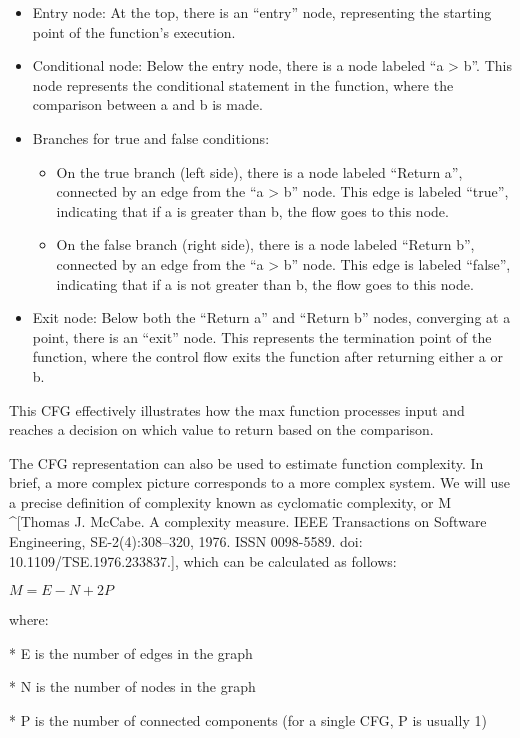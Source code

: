 \begin{markdown}

\begin{itemize}
\item
Entry node: At the top, there is an “entry” node, representing the starting point of the function’s execution.

\item
Conditional node: Below the entry node, there is a node labeled “a > b”. This node represents the conditional statement in the function, where the comparison between a and b is made.

\item
Branches for true and false conditions:
\begin{itemize}
\item
On the true branch (left side), there is a node labeled “Return a”, connected by an edge from the “a > b” node. This edge is labeled “true”, indicating that if a is greater than b, the flow goes to this node.

\item
On the false branch (right side), there is a node labeled “Return b”, connected by an edge from the “a > b” node. This edge is labeled “false”, indicating that if a is not greater than b, the flow goes to this node.
\end{itemize}

\item
Exit node: Below both the “Return a” and “Return b” nodes, converging at a point, there is an “exit” node. This represents the termination point of the function, where the control flow exits the function after returning either a or b.
\end{itemize}

This CFG effectively illustrates how the max function processes input and reaches a decision on which value to return based on the comparison.

The CFG representation can also be used to estimate function complexity. In brief, a more complex picture corresponds to a more complex system. We will use a precise definition of complexity known as cyclomatic complexity, or M ^[Thomas J. McCabe. A complexity measure. IEEE Transactions on Software Engineering, SE-2(4):308–320, 1976. ISSN 0098-5589. doi: 10.1109/TSE.1976.233837.], which can be calculated as follows:
\end{markdown}

$M = E - N + 2P$

where:

\begin{markdown}
* E is the number of edges in the graph

* N is the number of nodes in the graph

* P is the number of connected components (for a single CFG, P is usually 1)
\end{markdown}

